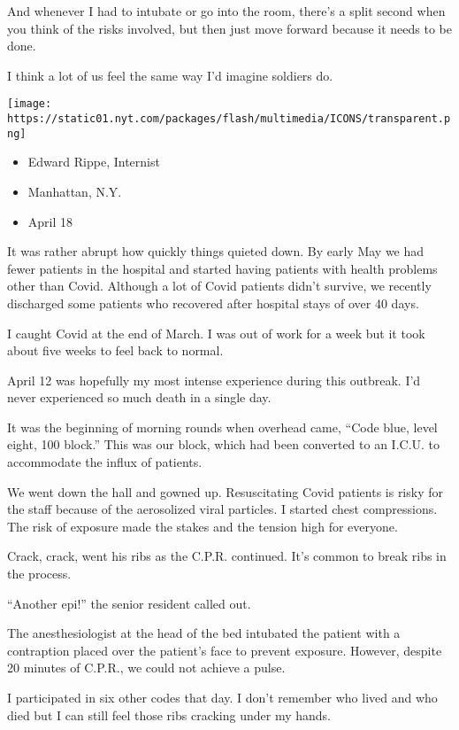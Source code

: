 And whenever I had to intubate or go into the room, there's a split
second when you think of the risks involved, but then just move forward
because it needs to be done.

I think a lot of us feel the same way I'd imagine soldiers do.

\texttt{[image: https://static01.nyt.com/packages/flash/multimedia/ICONS/transparent.png]}

\begin{itemize}
\tightlist
\item
  Edward Rippe, Internist
\item
  Manhattan, N.Y.
\item
  April 18
\end{itemize}

It was rather abrupt how quickly things quieted down. By early May we
had fewer patients in the hospital and started having patients with
health problems other than Covid. Although a lot of Covid patients
didn't survive, we recently discharged some patients who recovered after
hospital stays of over 40 days.

I caught Covid at the end of March. I was out of work for a week but it
took about five weeks to feel back to normal.

April 12 was hopefully my most intense experience during this outbreak.
I'd never experienced so much death in a single day.

It was the beginning of morning rounds when overhead came, ``Code blue,
level eight, 100 block.'' This was our block, which had been converted
to an I.C.U. to accommodate the influx of patients.

We went down the hall and gowned up. Resuscitating Covid patients is
risky for the staff because of the aerosolized viral particles. I
started chest compressions. The risk of exposure made the stakes and the
tension high for everyone.

Crack, crack, went his ribs as the C.P.R. continued. It's common to
break ribs in the process.

``Another epi!'' the senior resident called out.

The anesthesiologist at the head of the bed intubated the patient with a
contraption placed over the patient's face to prevent exposure. However,
despite 20 minutes of C.P.R., we could not achieve a pulse.

I participated in six other codes that day. I don't remember who lived
and who died but I can still feel those ribs cracking under my hands.

